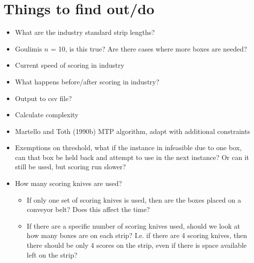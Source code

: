 \documentclass[a4paper, 11pt, twoside, onecolumn, openany]{article}
\begin{document}
\section{Things to find out/do}
\begin{itemize}
	\item What are the industry standard strip lengths?
	\item Goulimis $n$ = 10, is this true? Are there cases where more boxes are needed?
	\item Current speed of scoring in industry
	\item What happens before/after scoring in industry?
	\item Output to csv file?
	\item Calculate complexity
	\item Martello and Toth (1990b) MTP algorithm, adapt with additional constraints
	\item Exemptions on threshold, what if the instance in infeasible due to one box, can that box be held back and attempt to use in the next instance? Or can it still be used, but scoring run slower?
	\item How many scoring knives are used?
	\begin{itemize}
		\item If only one set of scoring knives is used, then are the boxes placed on a conveyor belt? Does this affect the time?
		\item If there are a specific number of scoring knives used, should we look at how many boxes are on each strip? I.e. if there are 4 scoring knives, then there should be only 4 scores on the strip, even if there is space available left on the strip?
		
	\end{itemize}
	
\end{itemize}

\begin{comment}
\begin{table}[!htb]
\centering
\begin{tabular}{|c|c|}
\hline
\multicolumn{2}{|c|}{Match}\\ \hline
0 & 19 \\ \hline
1 & 18 \\ \hline
2 & 17 \\ \hline
3 & 16 \\ \hline
4 & 15 \\ \hline
5 & 14 \\ \hline
6 & 13 \\ \hline
7 & 11 \\ \hline
8 & 12 \\ \hline
9 & 10 \\
\hline
\end{tabular}
\caption{Match List.}
\end{table}	
\end{comment}
\end{document}
